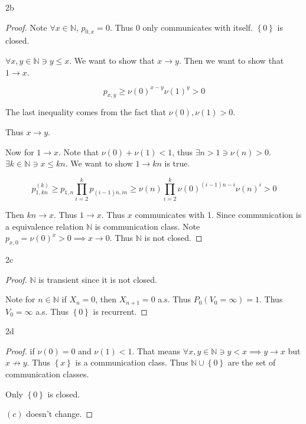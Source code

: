 \documentclass{article}
\newcommand{\N}{\mathbb{N}}
\begin{document}
\begin{PROB}{2b}\label{Problem 2b.}
\end{PROB}
\begin{proof}
    Note $\forall x \in \N$, $p_{0, x} = 0$. Thus 0 only communicates with itself. $\left\{ 0 \right\}$ is closed. 
    
    $\forall x, y \in \N \ni y \leq x$. We want to show that $x \to y$. Then we want to show that $1 \to x$. 
    
    \[p_{x, y} \geq \nu(0)^{x - y} \nu(1)^{y} > 0\]

    The last inequality comes from the fact that $\nu(0), \nu(1) > 0$. 
    
    Thus $x \to y$. 
    
    Now for $1 \to x$. Note that $\nu(0) + \nu(1) < 1$, thus $\exists n > 1 \ni \nu(n) > 0$. $\exists k \in \N \ni x \leq kn$. We want to show $1 \to kn$ is true. 
    
    \[p_{1, kn}^{(k)} \geq p_{1, n}\prod_{i = 2}^{k} p_{(i - 1)n , in} \geq \nu(n) \prod_{i = 2}^{k} \nu(0)^{(i - 1)n - i}\nu(n)^{i} > 0\]
    
    Then $kn \to x$. Thus $1 \to x$. Thus $x$ communicates with 1. Since communication is a equivalence relation $\N$ is communication class. Note $p_{x, 0} = \nu(0)^x > 0 \implies x \to 0$. Thus $\N$ is not closed.   
\end{proof}

\begin{PROB}{2c}\label{Problem 2c.}
\end{PROB}
\begin{proof}
    $\N$ is transient since it is not closed.

    Note for $n \in \N$ if $X_n = 0$, then $X_{n + 1} = 0$ a.s. Thus $P_0(V_0 = \infty) = 1$. Thus $V_0 = \infty$ a.s. Thus $\left\{ 0 \right\}$ is recurrent.      
\end{proof}

\begin{PROB}{2d}\label{Problem 2d.}
    
\end{PROB}
\begin{proof}
    if $\nu(0) = 0$ and $\nu(1) < 1$. That means $\forall x, y \in \N \ni y < x \implies y \to x$ but $x \not \to y$. Thus $\left\{ x \right\}$ is a communication class. Thus $\N \cup \left\{ 0 \right\}$ are the set of communication classes. 

    Only $\left\{ 0 \right\}$ is closed. 
    
    $(c)$ doesn't change. 
\end{proof}
\end{document}
